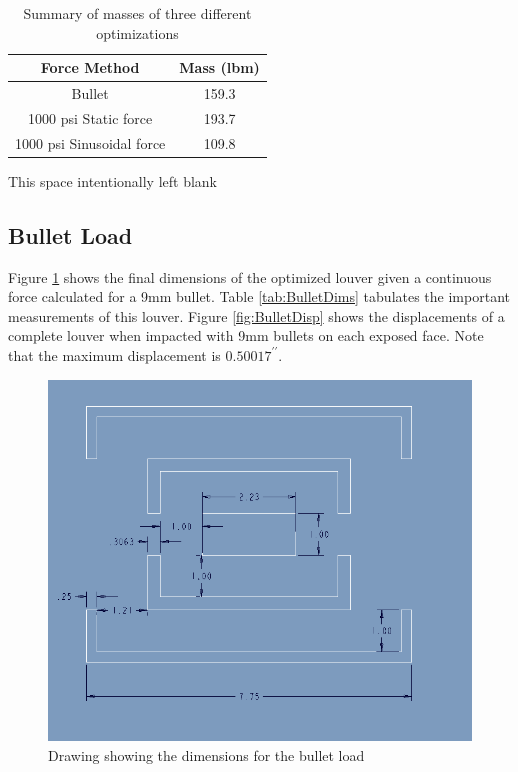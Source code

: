 \documentclass[12pt,letterpaper]{report}
\newcommand{\inchsign}{^{\prime\prime}} %
\begin{document}
		\begin{table}[H]
			\centering
			\begin{tabular}{|c|c|}
			\hline \textbf{Force Method} & \textbf{Mass (lbm)}\\
			\hline Bullet & 159.3\\
			\hline 1000 psi Static force & 193.7\\
			\hline 1000 psi Sinusoidal force & 109.8\\
			\hline
			\end{tabular}
			\caption{Summary of masses of three different optimizations}
			\label{tab:SummaryOfMass}
		\end{table}
		
		\begin{center}
			\vfill 
			\begin{scriptsize}
				This space intentionally left blank
			\end{scriptsize}
		\end{center}
		
		\newpage
		\subsection{Bullet Load}
		Figure \ref{fig:BulletDraw} shows the final dimensions of the optimized louver given a continuous force calculated for a 9mm bullet.  Table \ref{tab:BulletDims} tabulates the important measurements of this louver.  Figure \ref{fig:BulletDisp} shows the displacements of a complete louver when impacted with 9mm bullets on each exposed face.  Note that the maximum displacement is $0.50017\inchsign$.
		
		\graphicspath{ {./ScreenShots/Bullet/} }
		\begin{figure}[H]
			\centering
			\includegraphics[width=.75\textwidth]{BulletAssyDraw}
			\caption{Drawing showing the dimensions for the bullet load}
			\label{fig:BulletDraw}
		\end{figure}
		
\end{document}
